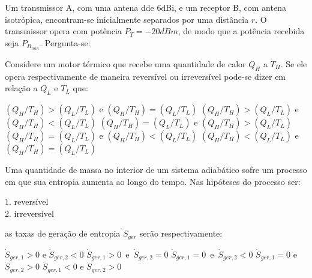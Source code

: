 \documentclass[answers]{exam}
\begin{document}
\begin{questions}
  \question Um transmissor A, com uma antena dde 6dBi, e um receptor B, com antena isotrópica, encontram-se inicialmente separados por uma distância $r$. O transmissor opera com potência $P_T = -20 dBm$, de modo que a potência recebida seja $P_{R_{min}}$. Pergunta-se:




  \question Considere um motor térmico que recebe uma quantidade de calor $Q_H$ a $T_H$. Se ele opera respectivamente de maneira reversível ou irreversível pode-se dizer em relação a $Q_L$ e $T_L$ que:
  \begin{checkboxes}
    \choice $(Q_H / T_H) > (Q_L / T_L)$ e $(Q_H / T_H) = (Q_L / T_L)$
    \choice $(Q_H / T_H) > (Q_L / T_L)$ e $(Q_H / T_H) < (Q_L / T_L)$
    \choice $(Q_H / T_H) = (Q_L / T_L)$ e $(Q_H / T_H) > (Q_L / T_L)$
    \CorrectChoice $(Q_H / T_H) = (Q_L / T_L)$ e $(Q_H / T_H) < (Q_L / T_L)$
    \choice $(Q_H / T_H) < (Q_L / T_L)$ e $(Q_H / T_H) = (Q_L / T_L)$
  \end{checkboxes}


  \question Uma quantidade de massa no interior de um sistema adiabático sofre um processo em que sua entropia aumenta ao longo do tempo. Nas hipóteses do processo ser:

  1. reversível\\
  2. irreversível

  as taxas de geração de entropia $\dot S_{ger}$ serão respectivamente:
  \begin{checkboxes}
    \choice $\dot S_{ger, 1} > 0$ e $\dot S_{ger, 2} < 0$
    \choice $\dot S_{ger, 1} > 0$\ e\ $\dot S_{ger, 2} = 0$
    \choice $\dot S_{ger, 1} = 0$\ e\ $\dot S_{ger, 2} < 0$
    \CorrectChoice $\dot S_{ger, 1} = 0$ e $\dot S_{ger, 2} > 0$
    \choice $\dot S_{ger, 1} < 0$ e $\dot S_{ger, 2} > 0$
  \end{checkboxes}



\end{questions}
\end{document}
